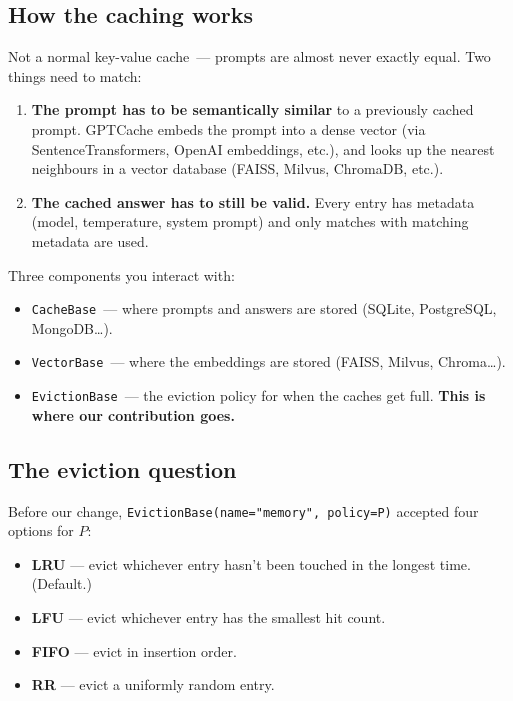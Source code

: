 \documentclass[11pt,a4paper]{article}
\begin{document}
\subsection{How the caching works}
Not a normal key-value cache~--- prompts are almost never exactly equal.
Two things need to match:
\begin{enumerate}[leftmargin=1.5em,itemsep=0.1em]
  \item \textbf{The prompt has to be semantically similar} to a
        previously cached prompt. GPTCache embeds the prompt into a
        dense vector (via SentenceTransformers, OpenAI embeddings,
        etc.), and looks up the nearest neighbours in a vector database
        (FAISS, Milvus, ChromaDB, etc.).
  \item \textbf{The cached answer has to still be valid.} Every entry
        has metadata (model, temperature, system prompt) and only
        matches with matching metadata are used.
\end{enumerate}

Three components you interact with:
\begin{itemize}[leftmargin=1.5em,itemsep=0.1em]
  \item \texttt{CacheBase}~--- where prompts and answers are stored
        (SQLite, PostgreSQL, MongoDB\ldots).
  \item \texttt{VectorBase}~--- where the embeddings are stored (FAISS,
        Milvus, Chroma\ldots).
  \item \texttt{EvictionBase}~--- the eviction policy for when the
        caches get full. \textbf{This is where our contribution goes.}
\end{itemize}

\subsection{The eviction question}
Before our change, \texttt{EvictionBase(name="memory", policy=P)}
accepted four options for $P$:
\begin{itemize}[leftmargin=1.5em,itemsep=0.1em]
  \item \textbf{LRU} --- evict whichever entry hasn't been touched in the
        longest time. (Default.)
  \item \textbf{LFU} --- evict whichever entry has the smallest hit
        count.
  \item \textbf{FIFO} --- evict in insertion order.
  \item \textbf{RR} --- evict a uniformly random entry.
\end{itemize}
\end{document}
